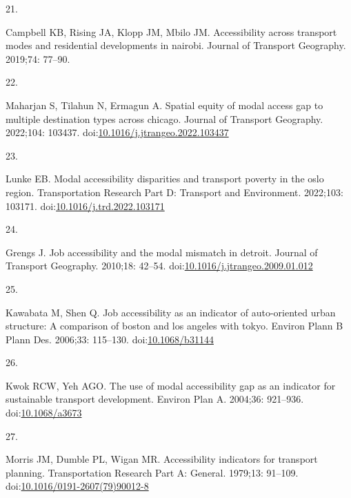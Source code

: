 \documentclass[10pt,letterpaper]{article}
\newlength{\cslhangindent}
\newlength{\csllabelwidth}
\newlength{\cslentryspacingunit} %
\newenvironment{CSLReferences}[2] %
 {%
  \setlength{\parindent}{0pt}
  \ifodd #1
  \let\oldpar\par
  \def\par{\hangindent=\cslhangindent\oldpar}
  \fi
  \setlength{\parskip}{#2\cslentryspacingunit}
 }%
 {}
\newcommand{\CSLLeftMargin}[1]{\parbox[t]{\csllabelwidth}{#1}}
\newcommand{\CSLRightInline}[1]{\parbox[t]{\linewidth - \csllabelwidth}{#1}\break}
\begin{document}
\begin{CSLReferences}{0}{0}
\leavevmode{}%
\CSLLeftMargin{21. }%
\CSLRightInline{Campbell KB, Rising JA, Klopp JM, Mbilo JM.
Accessibility across transport modes and residential developments in
nairobi. Journal of Transport Geography. 2019;74: 77--90. }

\leavevmode{}%
\CSLLeftMargin{22. }%
\CSLRightInline{Maharjan S, Tilahun N, Ermagun A. Spatial equity of
modal access gap to multiple destination types across chicago. Journal
of Transport Geography. 2022;104: 103437.
doi:\href{https://doi.org/10.1016/j.jtrangeo.2022.103437}{10.1016/j.jtrangeo.2022.103437}}

\leavevmode{}%
\CSLLeftMargin{23. }%
\CSLRightInline{Lunke EB. Modal accessibility disparities and transport
poverty in the oslo region. Transportation Research Part D: Transport
and Environment. 2022;103: 103171.
doi:\href{https://doi.org/10.1016/j.trd.2022.103171}{10.1016/j.trd.2022.103171}}

\leavevmode{}%
\CSLLeftMargin{24. }%
\CSLRightInline{Grengs J. Job accessibility and the modal mismatch in
detroit. Journal of Transport Geography. 2010;18: 42--54.
doi:\href{https://doi.org/10.1016/j.jtrangeo.2009.01.012}{10.1016/j.jtrangeo.2009.01.012}}

\leavevmode{}%
\CSLLeftMargin{25. }%
\CSLRightInline{Kawabata M, Shen Q. Job accessibility as an indicator of
auto-oriented urban structure: A comparison of boston and los angeles
with tokyo. Environ Plann B Plann Des. 2006;33: 115--130.
doi:\href{https://doi.org/10.1068/b31144}{10.1068/b31144}}

\leavevmode{}%
\CSLLeftMargin{26. }%
\CSLRightInline{Kwok RCW, Yeh AGO. The use of modal accessibility gap as
an indicator for sustainable transport development. Environ Plan A.
2004;36: 921--936.
doi:\href{https://doi.org/10.1068/a3673}{10.1068/a3673}}

\leavevmode{}%
\CSLLeftMargin{27. }%
\CSLRightInline{Morris JM, Dumble PL, Wigan MR. Accessibility indicators
for transport planning. Transportation Research Part A: General.
1979;13: 91--109.
doi:\href{https://doi.org/10.1016/0191-2607(79)90012-8}{10.1016/0191-2607(79)90012-8}}


\end{CSLReferences}
\end{document}
